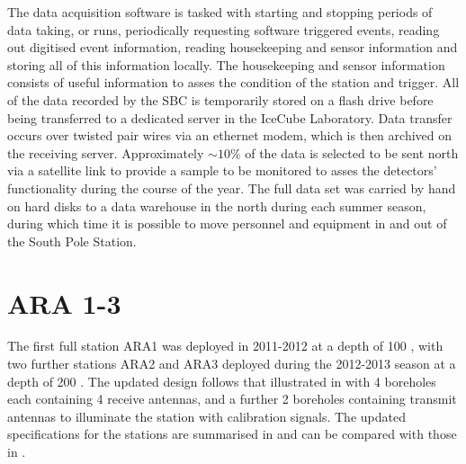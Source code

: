 The data acquisition software is tasked with starting and stopping  periods of data taking, or runs, periodically requesting software triggered events, reading out digitised event information, reading housekeeping and sensor information and storing all of this information locally. The housekeeping and sensor information consists of useful information to asses the condition of the station and trigger. All of the data recorded by the SBC is temporarily stored on a flash drive before being transferred to a dedicated server in the IceCube Laboratory. Data transfer occurs over twisted pair wires via an ethernet modem, which is then archived on the receiving server. Approximately $\sim 10 \%$ of the data is selected to be sent north via a satellite link to provide a sample to be monitored to asses the detectors' functionality during the course of the year. The full data set was carried by hand on hard disks to a data warehouse in the north during each summer season, during which time it is possible to move personnel and equipment in and out of the South Pole Station. 


\section{ARA 1-3}
\label{sec:ara-detector:ARA1-3}

The first full station ARA1 was deployed in 2011-2012 at a depth of 100 \meter, with two further stations ARA2 and ARA3 deployed during the 2012-2013 season at a depth of 200 \meter. The updated design follows that illustrated in  with 4 boreholes each containing 4 receive antennas, and a further 2 boreholes containing transmit antennas to illuminate the station with calibration signals. The updated specifications for the stations are summarised in  and can be compared with those in .

